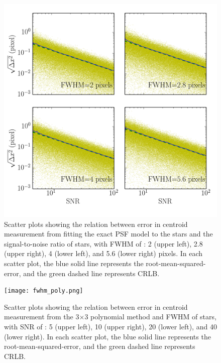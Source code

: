\documentclass[12pt, preprint]{aastex}
\begin{document}
\begin{figure}[!htb]
  \includegraphics[width=\linewidth]{snr_psffitting.png}
\endminipage
\caption{Scatter plots showing the relation between error in centroid measurement
from fitting the exact PSF model to the stars and the signal-to-noise ratio of stars,
with FWHM of : 2 (upper left), 2.8 (upper right), 4 (lower left), and 5.6 (lower right)
pixels. In each scatter plot, the blue solid line represents the root-mean-squared-error, and the green dashed line represents CRLB.}\label{4}
\end{figure}


\begin{figure}[!htb]
  \texttt{[image: fwhm\_poly.png]}
\endminipage
\caption{Scatter plots showing the relation between error in centroid measurement
from the 3$\times$3 polynomial method and FWHM of stars, with SNR  of : 5 (upper left),
10 (upper right), 20 (lower left), and 40 (lower right). In each scatter plot, 
the blue solid
 line represents the root-mean-squared-error, and the green dashed line represents CRLB.}\label{5}
\end{figure}
\end{document}
